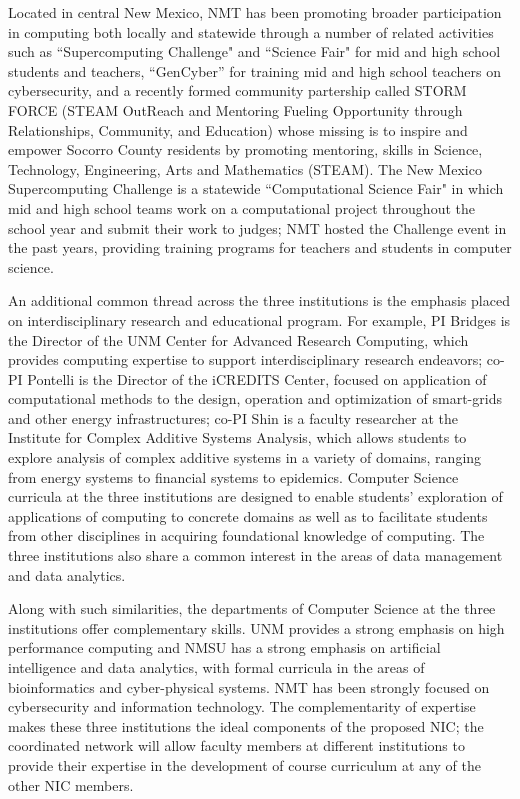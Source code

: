 Located in central New Mexico, NMT has been promoting broader participation in computing both locally and statewide through a number of related activities such as ``Supercomputing Challenge" and ``Science Fair" for mid and high school students and teachers, ``GenCyber'' for training mid and high school teachers on cybersecurity, and a recently formed community partership called STORM FORCE (STEAM OutReach and Mentoring Fueling Opportunity through Relationships, Community, and Education) whose missing is to inspire and empower Socorro County residents by promoting mentoring, skills in Science, Technology, Engineering, Arts and Mathematics (STEAM). The New Mexico Supercomputing Challenge is a statewide ``Computational Science Fair" in which mid and high school teams work on a computational project throughout the school year and submit their work to judges; NMT hosted the Challenge event in the past years, providing training programs for teachers and students in computer science.


An additional common thread across the three institutions is the emphasis placed on interdisciplinary research and educational program. For example, PI Bridges is the Director of the UNM Center for Advanced Research Computing, which provides computing expertise to support interdisciplinary research endeavors; co-PI Pontelli is the Director of the iCREDITS Center, focused on application of computational methods to the design, operation and optimization of smart-grids and other energy infrastructures; co-PI Shin is a faculty researcher at the Institute for Complex Additive Systems Analysis, which allows students to explore analysis of complex additive systems in a variety of domains, ranging from energy systems to financial systems to epidemics. Computer Science curricula at the three institutions are  designed to enable students' exploration of applications of computing to concrete domains as well as to facilitate students from other disciplines in acquiring foundational knowledge of computing. The three institutions also share a common interest in the areas of data management and data analytics.


Along with such similarities, the departments of Computer Science at the three institutions offer complementary skills. UNM provides a strong emphasis on high performance computing and 
NMSU has a strong emphasis on artificial intelligence and data analytics, with formal curricula in the areas of bioinformatics and cyber-physical systems. 
NMT has been strongly focused on cybersecurity and information technology. The complementarity of expertise makes these three institutions the ideal components of the proposed NIC; the coordinated network will allow faculty members at different institutions to provide their expertise in the development of course curriculum at any of the other NIC members. 

